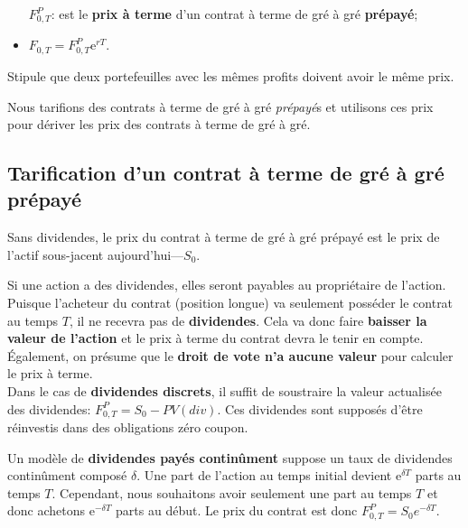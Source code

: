 \documentclass[10pt, french]{article}
\begin{document}
\begin{multicols*}{2}
\begin{distributions}
\begin{itemize}
	\item[$F_{0, T}^{P}$:]	est le \textbf{prix à terme} d'un contrat à terme de gré à gré \textbf{prépayé};
	\item	$F_{0, T} = F_{0, T}^{P} \textrm{e}^{rT}$.
\end{itemize}
\end{distributions}

\begin{definitionNOHFILL}
Stipule que deux portefeuilles avec les mêmes profits doivent avoir le même prix.

Nous tarifions des contrats à terme de gré à gré \textit{prépayé}s et utilisons ces prix pour dériver les prix des contrats à terme de gré à gré. 
\end{definitionNOHFILL}

\columnbreak

\subsection*{Tarification d'un \textbf{contrat à terme de gré à gré prépayé}}

Sans dividendes, le prix du contrat à terme de gré à gré prépayé est le prix de l'actif sous-jacent aujourd'hui---$S_{0}$. 

Si une action a des dividendes, elles seront payables au propriétaire de l'action. Puisque l'acheteur du contrat (position longue) va seulement posséder le contrat au temps $T$, il ne recevra pas de \textbf{dividendes}. Cela va donc faire \textbf{baisser la valeur de l'action} et le prix à terme du contrat devra le tenir en compte. Également, on présume que le \textbf{droit de vote n'a aucune valeur} pour calculer le prix à terme.\\

Dans le cas de \textbf{dividendes discrets}, il suffit de soustraire la valeur actualisée des dividendes: $F_{0, T}^{P} = S_{0} - PV(div)$. Ces dividendes sont supposés d'être réinvestis dans des obligations zéro coupon.

Un modèle de \textbf{dividendes payés continûment} suppose un taux de dividendes continûment composé $\delta$. Une part de l'action au temps initial devient $\textrm{e}^{\delta T}$ parts au temps $T$. Cependant, nous souhaitons avoir seulement une part au temps $T$ et donc achetons $\textrm{e}^{-\delta T}$ parts au début. Le prix du contrat est donc $F_{0, T}^{P} = S_{0} e^{-\delta T}$.


\end{multicols*}
\end{document}
